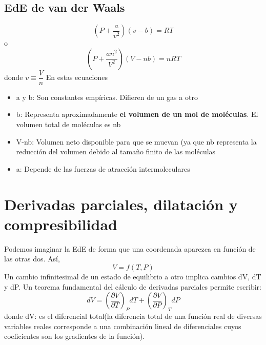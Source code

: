 \documentclass[12pt,twocolumn,a4paper]{report}
\begin{document}
\subsection*{EdE de van der Waals}
\begin{equation*}
\left(P + \dfrac{a}{v^2}\right)(v - b) = RT
\end{equation*}
o 
\begin{equation*}
\left(P + \dfrac{an^2}{V^2}\right)(V - nb) = nRT
\end{equation*}
donde $v \equiv \dfrac{V}{n}$
En estas ecuaciones
\begin{itemize}
\setlength\itemsep{0.001cm}
\item{a y b: Son constantes empíricas. Difieren de un gas a otro}
\item{b: Representa aproximadamente \textbf{el volumen de un mol de moléculas}. El volumen total de moléculas es nb}
\item{V-nb: Volumen neto disponible para que se muevan (ya que nb representa la reducción del volumen debido al tamaño finito de las moléculas}
\item{a: Depende de las fuerzas de atracción intermoleculares}
\end{itemize}

\section*{Derivadas parciales, dilatación y compresibilidad}
Podemos imaginar la EdE de forma que una coordenada aparezca en función de las otras dos. Así, 
\begin{equation*}
V = f(T,P)
\end{equation*}
Un cambio infinitesimal de un estado de equilibrio a otro implica cambios dV, dT y dP. Un teorema fundamental del cálculo de derivadas parciales permite escribir:
\begin{equation*}
dV = \left(\frac{\partial V}{\partial T}\right)_P dT + \left(\frac{\partial V}{\partial P}\right)_T dP
\end{equation*}
donde dV: es el diferencial total(la diferencia total de una función real de diversas variables reales corresponde a una combinación lineal de diferenciales cuyos coeficientes son los gradientes de la función).
\end{document}
